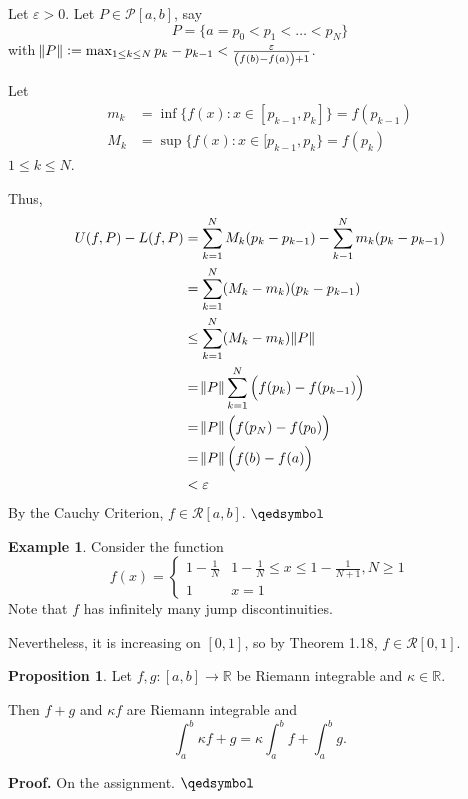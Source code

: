 \documentclass[11pt]{article}
\theoremstyle{definition}
\newtheorem{exmp}[thm]{Example}
\newtheorem{prop}[thm]{Proposition}
\newcommand{\mbR}{\ensuremath{\mathbb{R}}}
\begin{document}
Let $\varepsilon > 0$. Let $P \in \mathcal{P}[a, b]$, say
$$P = \{a = p_0 < p_1 < \dots < p_N\}$$
with $\norm{P} := \max_{1 \leq k \leq N} p_k - p_{k-1} < \frac{\varepsilon}{\left(f(b) - f(a)\right) + 1}$. 

Let
\begin{align*}
m_k & = \inf\{f(x) : x \in [p_{k-1}, p_k]\} = f(p_{k-1}) \\
M_k & = \sup\{f(x) : x \in [p_{k-1}, p_k\} = f(p_k)
\end{align*}
$1 \leq k \leq N$. 

Thus,
\begin{align*}
U(f, P) - L(f, P) & = \sum_{k=1}^N M_k (p_k - p_{k-1}) - \sum_{k-1}^N m_k (p_k - p_{k-1}) \\
			   & = \sum_{k=1}^N (M_k - m_k) (p_k - p_{k-1}) \\
			   & \leq \sum_{k=1}^N (M_k - m_k) \norm{P} \\
			   & = \norm{P} \sum_{k=1}^N \Big(f(p_k) - f(p_{k-1})\Big) \\
			   & = \norm{P} \Big(f(p_N) - f(p_0)\Big) \\
			   & = \norm{P} \Big(f(b) - f(a)\Big) \\
			   & < \varepsilon
\end{align*}
By the Cauchy Criterion, $f \in \mathcal{R}[a, b]$. $\qedsymbol$

\begin{exmp}
Consider the function
$$ f(x) = \begin{cases}
			1 - \frac1N & 1 - \frac1N \leq x \leq 1 - \frac1{N+1}, N \geq 1 \\
			1 & x = 1
		 \end{cases}$$
Note that $f$ has infinitely many jump discontinuities. 

Nevertheless, it is increasing on $[0, 1]$, so by Theorem 1.18, $f \in \mathcal{R}[0, 1]$. 
\end{exmp}

\begin{prop}
Let $f, g : [a, b] \to \mbR$ be Riemann integrable and $\kappa \in \mbR$. 

Then $f + g$ and $\kappa f$ are Riemann integrable and
$$\int_a^b \kappa f + g = \kappa \int_a^b f + \int_a^b g \text{.}$$
\end{prop}
\textbf{Proof.} On the assignment. $\qedsymbol$
\end{document}
